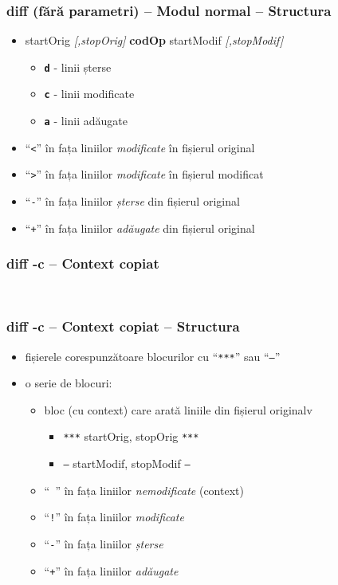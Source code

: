 \documentclass{beamer}
\begin{document}
\begin{frame}
  \frametitle{\textbf{diff} (fără parametri) – Modul normal – Structura}
  \begin{itemize}
    \item startOrig \textit{[,stopOrig]} \textbf{codOp} startModif \textit{[,stopModif]}
      \begin{itemize}
        \item \textbf{\texttt{d}} - linii șterse
        \item \textbf{\texttt{c}} - linii modificate
        \item \textbf{\texttt{a}} - linii adăugate
      \end{itemize}
    \item ``\texttt{\textless}'' în fața liniilor \textit{modificate} în fișierul original
    \item ``\texttt{\textgreater}'' în fața liniilor \textit{modificate} în fișierul modificat
    \item ``\texttt{-}'' în fața liniilor \textit{șterse} din fișierul original
    \item ``\texttt{+}'' în fața liniilor \textit{adăugate} din fișierul original
  \end{itemize}
\end{frame}

\begin{frame}
  \frametitle{\textbf{diff -c} – Context copiat}
  \footnotesize \tt 
\end{frame}

\begin{frame}
  \frametitle{\textbf{diff -c} – Context copiat – Structura}
  \begin{itemize}
    \item fișierele corespunzătoare blocurilor cu ``\texttt{\texttt{***}}'' sau ``\texttt{---}''
    \item o serie de blocuri:
      \begin{itemize}
        \item bloc (cu context) care arată liniile din fișierul originalv
          \begin{itemize} 
          \item \texttt{***} startOrig, stopOrig \texttt{***}
          \item \texttt{---} startModif, stopModif \texttt{---}
          \end{itemize}
        \item ``\texttt{ }'' în fața liniilor \textit{nemodificate} (context)
        \item ``\texttt{!}'' în fața liniilor \textit{modificate}
        \item ``\texttt{-}'' în fața liniilor \textit{șterse}
        \item ``\texttt{+}'' în fața liniilor \textit{adăugate}
      \end{itemize}
  \end{itemize}
\end{frame}
\end{document}
